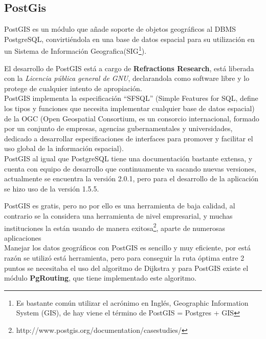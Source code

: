 
    \subsection{PostGis} %
    \label{sec:postgis}

      PostGIS es un módulo  que a\~nade soporte de objetos geográficos al DBMS PostgreSQL, convirtiéndola en una base de datos espacial para su utilización en un Sistema de Informaci\'on Geografica(SIG\footnote{ Es bastante común utilizar el acrónimo en Inglés, Geographic Information System (GIS), de hay viene el término de PostGIS = Postgres + GIS}).

      El desarrollo de PostGIS está a cargo de \textbf{Refractions Research}, está liberada con la \emph{Licencia pública general de GNU}, declarandola como software libre y lo protege de cualquier intento de apropiaci\'on.\\

      PostGIS implementa la especificaci\'on ``SFSQL'' (Simple Features for SQL, define los tipos y funciones que necesita implementar cualquier base de datos espacial) de la OGC (Open Geospatial Consortium, es un consorcio internacional, formado por un conjunto de empresas, agencias gubernamentales y universidades, dedicado a desarrollar especificaciones de interfaces para promover y facilitar el uso global de la información espacial).\\

      PostGIS al igual que PostgreSQL tiene una documentaci\'on bastante extensa, y cuenta con equipo de desarrollo que continuamente va sacando nuevas versiones, actualmente se encuentra la versi\'on 2.0.1, pero para el desarrollo de la aplicaci\'on se hizo uso de la versi\'on 1.5.5.

      PostGIS es gratis, pero no por ello es una herramienta de baja calidad, al contrario se la considera una herramienta de nivel empresarial, y muchas instituciones la est\'an usando de manera exitosa\footnote{ http://www.postgis.org/documentation/casestudies/}, aparte de numerosas aplicaciones \\

      Manejar los datos geográficos con PostGIS es sencillo y muy eficiente, por está raz\'on se utilizó está herramienta, pero para conseguir la ruta óptima entre 2 puntos se necesitaba el uso del algoritmo de Dijkstra y para PostGIS existe el módulo \textbf{PgRouting}, que tiene implementado este algoritmo.

